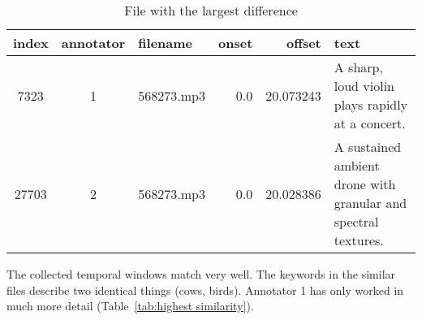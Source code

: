 \begin{table}[h]
  \caption{File with the largest difference}
  \label{tab:largest difference}
  \centering
  \begin{tabular}{cclrrp{7.5cm}}
    \toprule
    index & annotator & filename & onset & offset & text \\
    \midrule
    7323 & 1 & 568273.mp3 & 0.0 & 20.073243 & A sharp, loud violin plays rapidly at a concert. \\
    27703 & 2 & 568273.mp3 & 0.0 & 20.028386 & A sustained ambient drone with granular and spectral textures. \\
    \bottomrule
  \end{tabular}
\end{table}

The collected temporal windows match very well. The keywords in the similar files describe two identical things (cows, birds).
Annotator 1 has only worked in much more detail (Table~\ref{tab:highest similarity}).

